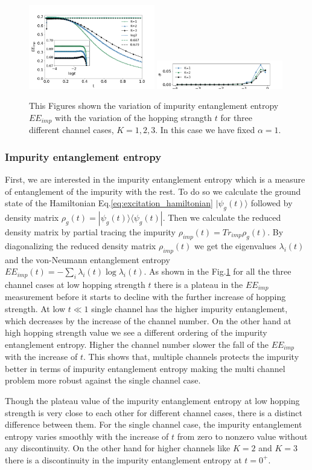 \documentclass[reprint,prb,superscriptaddress]{revtex4-2}
\begin{document}
\begin{figure}[!htpb]
\centering
\includegraphics[width=0.49\textwidth]{plt/A_I1_ch123_['d']}
\includegraphics[width=0.49\textwidth]{plt/errorbar_A_I1_ch123_['d']}
\caption{This Figures shown the variation of impurity entanglement entropy $EE_{imp}$ with the variation of the hopping strangth $t$ for three different channel cases, $K=1,2,3$. In this case we have fixed $\alpha=1$.}
\label{fig:EE_imp_vs_t_K}
\end{figure}

\subsubsection{Impurity entanglement entropy}
\noindent  First, we are interested in the impurity entanglement entropy which is a measure of entanglement of the impurity with the rest. To do so we calculate the ground state of the Hamiltonian Eq.\eqref{eq:excitation_hamiltonian} $|\psi_g(t)\rangle$ followed by density matrix $\rho_g(t)=|\psi_g(t)\rangle \langle\psi_g (t)|$. Then we calculate the reduced density matrix by partial tracing the impurity $\rho_{imp}(t)=Tr_{imp} \rho_g(t)$. By diagonalizing the reduced density matrix $\rho_{imp}(t)$ we get the eigenvalues $\lambda_i(t)$ and the von-Neumann entanglement entropy $EE_{imp}(t)=-\sum_i\lambda_i(t) \log \lambda_i(t)$. As shown in the Fig.\ref{fig:EE_imp_vs_t_K} for all the three channel cases at low hopping strength $t$ there is a plateau in the $EE_{imp}$ measurement before it starts to decline with the further increase of hopping strength. At low $t\ll 1$ single channel has the higher impurity entanglement, which decreases by the increase of the channel number. On the other hand at high hopping strength value we see a different ordering of the impurity entanglement entropy. Higher the channel number slower the fall of the $EE_{imp}$ with the increase of $t$. This shows that, multiple channels protects the impurity better in terms of impurity  entanglement entropy making the multi channel problem more robust against the single channel case. 
\par Though the plateau value of the impurity entanglement entropy at low hopping strength is very close to each other for different channel cases, there is a distinct difference between them. For the single channel case, the impurity entanglement entropy varies smoothly with the increase of $t$ from zero to nonzero value without any discontinuity. On the other hand for higher channels like $K=2$ and $K=3$ there is a discontinuity in the impurity entanglement entropy at $t=0^+$.
\end{document}
